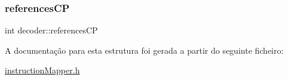\mbox{\label{structdecoder_a2f809cd678fa1d3f8dcf7125d466bc4f}} 
\subsubsection{\texorpdfstring{references\+CP}{referencesCP}}
{\footnotesize\ttfamily int decoder\+::references\+CP}



A documentação para esta estrutura foi gerada a partir do seguinte ficheiro\+:\begin{DoxyCompactItemize}
\item 
\hyperlink{instruction_mapper_8h}{instruction\+Mapper.\+h}\end{DoxyCompactItemize}
